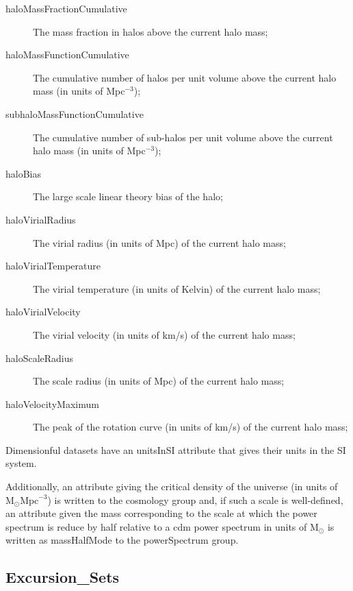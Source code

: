 \begin{description}
\item [{\normalfont \ttfamily haloMassFractionCumulative}] The mass fraction in halos above the current halo mass;
\item [{\normalfont \ttfamily haloMassFunctionCumulative}] The cumulative number of halos per unit volume above the current halo mass (in units of Mpc$^{-3}$);
\item [{\normalfont \ttfamily subhaloMassFunctionCumulative}] The cumulative number of sub-halos per unit volume above the current halo mass (in units of Mpc$^{-3}$);
\item [{\normalfont \ttfamily haloBias}] The large scale linear theory bias of the halo;
\item [{\normalfont \ttfamily haloVirialRadius}] The virial radius (in units of Mpc) of the current halo mass;
\item [{\normalfont \ttfamily haloVirialTemperature}] The virial temperature (in units of Kelvin) of the current halo mass;
\item [{\normalfont \ttfamily haloVirialVelocity}] The virial velocity (in units of km/s) of the current halo mass;
\item [{\normalfont \ttfamily haloScaleRadius}] The scale radius (in units of Mpc) of the current halo mass;
\item [{\normalfont \ttfamily haloVelocityMaximum}] The peak of the rotation curve (in units of km/s) of the current halo mass;
\end{description}
Dimensionful datasets have an {\normalfont \ttfamily unitsInSI} attribute that gives their units in the SI system.

Additionally, an attribute giving the critical density of the universe (in units of $\mathrm{M}_\odot \mathrm{Mpc}^{-3}$) is written to the {\normalfont \ttfamily cosmology} group and, if such a scale is well-defined, an attribute given the mass corresponding to the scale at which the power spectrum is reduce by half relative to a \gls{cdm} power spectrum in units of $\mathrm{M}_\odot$ is written as {\normalfont \ttfamily massHalfMode} to the {\normalfont \ttfamily powerSpectrum} group.

\subsection{{\normalfont \ttfamily Excursion\_Sets}}

